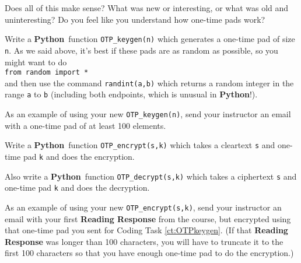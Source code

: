 \documentclass[12pt,letterpaper]{amsbook}
\theoremstyle{definition}
\theoremstyle{remark}
\numberwithin{figure}{section}
\numberwithin{exercise}{chapter}
\numberwithin{section}{chapter}
\numberwithin{equation}{section}
\numberwithin{table}{subsection}
\newcommand{\code}[1]{\colorbox{lg}{\texttt{#1}}}
\newcommand{\Python}{{\textbf{\ix{Python}}}}
\newcommand{\ix}[1]{{#1}\index{#1}}
\begin{document}
\vskip2mm
\begin{AZtcb}[label=az:onetimepad]{}{}
  Does all of this make sense?  What was new or interesting, or what was old
  and uninteresting?  Do you feel like you understand how one-time pads work?
\end{AZtcb}

\vskip2mm
\begin{CTtcb}[label=ct:OTPkeygen]{}{}
 Write a \Python\ function \code{OTP\_keygen(n)} which generates a one-time
 pad of size \code{n}.  As we said above, it's best if these pads are as
 random as possible, so you might want to do\\
 \hphantom{XXX}\code{from random import *}\\
 and then use the command \code{randint(a,b)} which returns a random
 integer in the range \code{a} to \code{b} (including both endpoints,
 which is unusual in {\Python}!).

 As an example of using your new \code{OTP\_keygen(n)}, send your instructor
 an email with a one-time pad of at least 100 elements.
\end{CTtcb}

\vskip2mm
\begin{CTtcb}[label=ct:OTPencrypt]{}{}
 Write a \Python\ function \code{OTP\_encrypt(s,k)} which takes
 a cleartext \code{s} and one-time pad \code{k} and does the
 encryption.

 Also write a \Python\ function \code{OTP\_decrypt(s,k)} which takes
 a ciphertext \code{s} and one-time pad \code{k} and does the
 decryption.

 As an example of using your new \code{OTP\_encrypt(s,k)}, send your
 instructor an email with your first \textbf{Reading Response} from the course,
 but encrypted using that one-time pad you sent for Coding Task
 \ref{ct:OTPkeygen}.  (If that \textbf{Reading Response} was longer than 100
 characters, you will have to truncate it to the first 100 characters so that
 you have enough one-time pad to do the encryption.)
\end{CTtcb}
\end{document}
